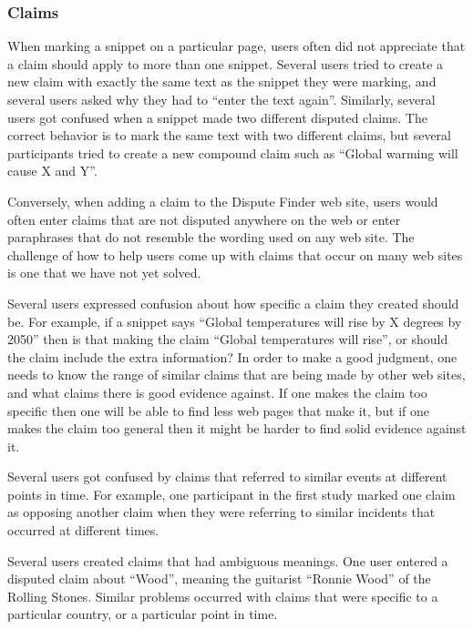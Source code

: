 \documentclass{www2010-submission}
\begin{document}
%

\subsubsection{Claims}

When marking a snippet on a particular page, users often did not appreciate that a claim should apply to more than one snippet. Several users tried to create a new claim with exactly the same text as the snippet they were marking, and several users asked why they had to ``enter the text again''. Similarly, several users got confused when a snippet made two different disputed claims. The correct behavior is to mark the same text with two different claims, but several participants tried to create a new compound claim such as ``Global warming will cause X and Y''. 

Conversely, when adding a claim to the Dispute Finder web site, users would often enter claims that are not disputed anywhere on the web or enter paraphrases that do not resemble the wording used on any web site. The challenge of how to help users come up with claims that occur on many web sites is one that we have not yet solved.

Several users expressed confusion about how specific a claim they created should be. For example, if a snippet says ``Global temperatures will rise by X degrees by 2050'' then is that making the claim ``Global temperatures will rise'', or should the claim include the extra information? In order to make a good judgment, one needs to know the range of similar claims that are being made by other web sites, and what claims there is good evidence against. If one makes the claim too specific then one will be able to find less web pages that make it, but if one makes the claim too general then it might be harder to find solid evidence against it.

Several users got confused by claims that referred to similar events at different points in time. For example, one participant in the first study marked one claim as opposing another claim when they were referring to similar incidents that occurred at different times. 

Several users created claims that had ambiguous meanings. One user entered a disputed claim about ``Wood'', meaning the guitarist ``Ronnie Wood'' of the Rolling Stones. Similar problems occurred with claims that were specific to a particular country, or a particular point in time. 
\end{document}
